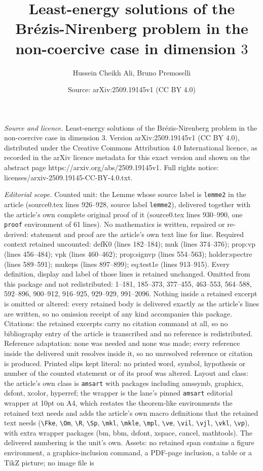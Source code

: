 \documentclass[10pt,a4paper]{amsart}
\title[Least-energy solutions of the Br\'ezis-Nirenberg problem in ]{Least-energy solutions of the Br\'ezis-Nirenberg problem in the non-coercive case in dimension $3$}
\author{Hussein Cheikh Ali, Bruno Premoselli}
\date{Source: arXiv:2509.19145v1 (CC BY 4.0)}
\begin{document}
\maketitle

\noindent\emph{Source and licence.} Least-energy solutions of the Br\'ezis-Nirenberg problem in the non-coercive case in dimension $3$. Version arXiv:2509.19145v1 (CC BY 4.0), distributed under the Creative Commons Attribution 4.0 International licence, as recorded in the arXiv licence metadata for this exact version and shown on the abstract page https://arxiv.org/abs/2509.19145v1. Full rights notice: licenses/arxiv-2509.19145-CC-BY-4.0.txt.\par\smallskip

\noindent\textit{Editorial scope.} Counted unit: the Lemme whose source label is \texttt{lemme2} in the article (source0.tex lines 926--928, source label \texttt{lemme2}), delivered together with the article's own complete original proof of it (source0.tex lines 930--990, one \texttt{proof} environment of 61 lines). No mathematics is written, repaired or re-derived: statement and proof are the article's own text line for line. Required context retained uncounted: defK0 (lines 182--184); muk (lines 374--376); prop:vp (lines 456--484); vpk (lines 460--462); prop:signvp (lines 554--563); holder:spectre (lines 589--591); mukeps (lines 897--899); eq:test1e (lines 913--915). Every definition, display and label of those lines is retained unchanged. Omitted from this package and not redistributed: 1--181, 185--373, 377--455, 463--553, 564--588, 592--896, 900--912, 916--925, 929--929, 991--2096. Nothing inside a retained excerpt is omitted or altered: every retained body is delivered exactly as the article's lines are written, so no omission receipt of any kind accompanies this package. Citations: the retained excerpts carry no citation command at all, so no bibliography entry of the article is transcribed and no reference is redistributed. Reference adaptation: none was needed and none was made; every reference inside the delivered unit resolves inside it, so no unresolved reference or citation is produced. Printed slips kept literal: no printed word, symbol, hypothesis or number of the counted statement or of its proof was altered. Layout and class: the article's own class is \texttt{amsart} with packages including amssymb, graphicx, dsfont, xcolor, hyperref; the wrapper is the lane's pinned \texttt{amsart} editorial wrapper at 10pt on A4, which restates the theorem-like environments the retained text needs and adds the article's own macro definitions that the retained text needs (\texttt{\textbackslash Fke}, \texttt{\textbackslash Om}, \texttt{\textbackslash R}, \texttt{\textbackslash Sp}, \texttt{\textbackslash mkl}, \texttt{\textbackslash mkle}, \texttt{\textbackslash mpl}, \texttt{\textbackslash ve}, \texttt{\textbackslash vil}, \texttt{\textbackslash vjl}, \texttt{\textbackslash vkl}, \texttt{\textbackslash vp}), with extra wrapper packages (bm, bbm, dsfont, xspace, cancel, mathtools). The delivered numbering is the unit's own. Assets: no retained span contains a figure environment, a graphics-inclusion command, a PDF-page inclusion, a table or a TikZ picture; no image file is 
\end{document}
